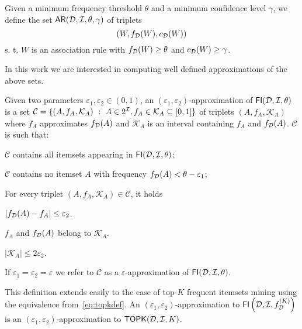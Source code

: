 Given a minimum frequency threshold $\theta$ and a minimum confidence level
$\gamma$, we define the set $\mathsf{AR}({\cal D},{\cal I},\theta,\gamma)$ of triplets
\[(W,f_{\cal D}(W),c_{\cal D}(W))\]
s. t. $W$ is an association rule with $f_{\cal D}(W)\ge\theta$ and
$c_{\cal D}(W)\ge\gamma$.

In this work we are interested in computing well defined approximations of the
above sets.

\begin{definition}\label{def:eapproxfi}
  Given two parameters $\varepsilon_1,\varepsilon_2\in(0,1)$, an
  $(\varepsilon_1,\varepsilon_2)$-approximation of
  $\mathsf{FI}({\cal D},{\cal I},\theta)$ is a set $\mathcal{C}=\{(A, f_A, \mathcal{K}_A) ~:~ A\in 2^{\cal I},
  f_A\in\mathcal{K}_A\subseteq[0,1]\}$ of triplets $(A, f_A, \mathcal{K}_A)$ where
  $f_A$ approximates $f_{\cal D}(A)$ and $\mathcal{K}_A$ is an interval containing
  $f_A$ and $f_{\cal D}(A)$.
  $\mathcal{C}$ is such that:
  \begin{enumerate*}
    \item $\mathcal{C}$ contains all itemsets appearing in
      $\mathsf{FI}({\cal D},{\cal I},\theta)$;
    \item $\mathcal{C}$ contains no itemset $A$ with frequency $f_{\cal D}(A)<\theta -
      \varepsilon_1$;
    \item For every triplet $(A, f_A,\mathcal{K}_A)\in\mathcal{C}$, it holds
      \begin{enumerate*}
       \item $|f_{\cal D}(A)-f_A|\le\varepsilon_2$.
       \item $f_A$ and $f_{\cal D}(A)$ belong to $\mathcal{K}_A$.
       \item $|\mathcal{K}_A|\le 2\varepsilon_2$.
     \end{enumerate*}
  \end{enumerate*}
  If $\varepsilon_1=\varepsilon_2=\varepsilon$ we refer to $\mathcal{C}$ 
  as a $\varepsilon$-approximation of $\mathsf{FI}({\cal D},{\cal I},\theta)$.
\end{definition} 
This definition extends easily to the case of top-$K$ frequent itemsets mining
using the equivalence from~\eqref{eq:topkdef}. An
$(\varepsilon_1,\varepsilon_2)$-approximation to
$\mathsf{FI}\left({\cal D},{\cal I},f^{(K)}_{\cal D}\right)$ is an
$(\varepsilon_1,\varepsilon_2)$-approximation to $\mathsf{TOPK}({\cal D},{\cal I},K)$.

